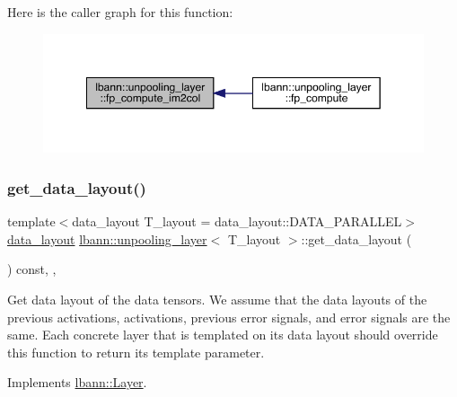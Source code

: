Here is the caller graph for this function\+:\nopagebreak
\begin{figure}[H]
\begin{center}
\leavevmode
\includegraphics[width=349pt]{classlbann_1_1unpooling__layer_ab4a0b7cc4711426434983c41cd7dbc63_icgraph}
\end{center}
\end{figure}
\mbox{\label{classlbann_1_1unpooling__layer_a453a34396ba52482508668d1658bf727}} 
\subsubsection{\texorpdfstring{get\+\_\+data\+\_\+layout()}{get\_data\_layout()}}
{\footnotesize\ttfamily template$<$data\+\_\+layout T\+\_\+layout = data\+\_\+layout\+::\+D\+A\+T\+A\+\_\+\+P\+A\+R\+A\+L\+L\+EL$>$ \\
\hyperlink{base_8hpp_a786677cbfb3f5677b4d84f3056eb08db}{data\+\_\+layout} \hyperlink{classlbann_1_1unpooling__layer}{lbann\+::unpooling\+\_\+layer}$<$ T\+\_\+layout $>$\+::get\+\_\+data\+\_\+layout (\begin{DoxyParamCaption}{ }\end{DoxyParamCaption}) const\hspace{0.3cm}{\ttfamily [inline]}, {\ttfamily [override]}, {\ttfamily [virtual]}}

Get data layout of the data tensors. We assume that the data layouts of the previous activations, activations, previous error signals, and error signals are the same. Each concrete layer that is templated on its data layout should override this function to return its template parameter. 

Implements \hyperlink{classlbann_1_1Layer_a5dfb66e81fc085997402a5e2241316bd}{lbann\+::\+Layer}.



